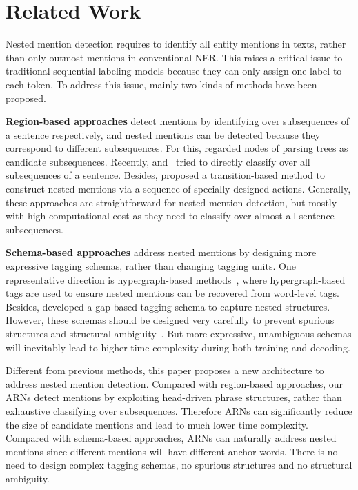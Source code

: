 \documentclass[11pt,a4paper]{article}
\begin{document}
\section{Related Work}
Nested mention detection requires to identify all entity mentions in texts, rather than only outmost mentions in conventional NER. This raises a critical issue to traditional sequential labeling models because they can only assign one label to each token. To address this issue, mainly two kinds of methods have been proposed.

\textbf{Region-based approaches} detect mentions by identifying over subsequences of a sentence respectively, and nested mentions can be detected because they correspond to different subsequences. For this, \citet{finkel2009nested} regarded nodes of parsing trees as candidate subsequences. Recently, \citet{P17-1114} and~\citet{D18-1309} tried to directly classify over all subsequences of a sentence. Besides, \citet{D18-1124} proposed a transition-based method to construct nested mentions via a sequence of specially designed actions. Generally, these approaches are straightforward for nested mention detection, but mostly with high computational cost as they need to classify over almost all sentence subsequences.

\textbf{Schema-based approaches} address nested mentions by designing more expressive tagging schemas, rather than changing tagging units. One representative direction is hypergraph-based methods~\cite{lu2015joint,N18-1079,D18-1019}, where hypergraph-based tags are used to ensure nested mentions can be recovered from word-level tags. Besides, \citet{D17-1276} developed a gap-based tagging schema to capture nested structures. However, these schemas should be designed very carefully to prevent spurious structures and structural ambiguity~\cite{D18-1019}. But  more expressive, unambiguous schemas will inevitably lead to higher time complexity during both training and decoding.

Different from previous methods, this paper proposes a new architecture to address nested mention detection. Compared with region-based approaches, our ARNs detect mentions by exploiting head-driven phrase structures, rather than exhaustive classifying over subsequences. Therefore ARNs can significantly reduce the size of candidate mentions and lead to much lower time complexity. Compared with schema-based approaches, ARNs can naturally address nested mentions since different mentions will have different anchor words. There is no need to design complex tagging schemas, no spurious structures and no structural ambiguity.
\end{document}
